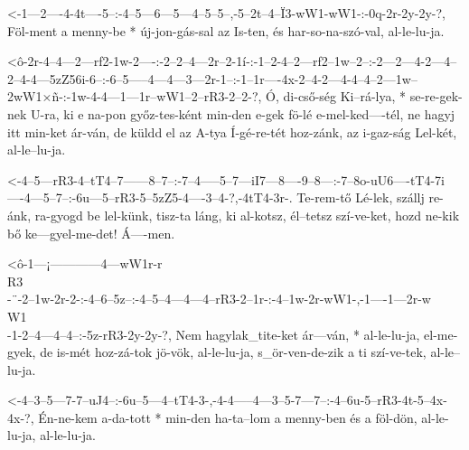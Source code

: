   {<-1---2----4-4t----5--:-4--5---6---5---4--5--5--,-5--2t--4--Ï3-wW1-wW1-:-0q-2r-2y-2y-?,}
  {  Föl-ment a menny-be * új-jon-gás-sal az Is-ten, és har-so-na-szó-val,  al-le-lu-ja.}

  {<ô-2r-4--4---2---rf2-1w-2----:-2--2--4---2r--2-1í-:-1--2-4--2---rf2--1w--2--:-2---2---4-2---4--2--4-4---5zZ56i-6--:-6--5-----4---4---3---2r-1--:-1--1r----4x-2--4-2---4-4--4--2---1w--2wW1×ñ-:-1w-4-4---1---1r--wW1--2--rR3-2--2-?,}
  {   Ó, di-cső-ség Ki--rá-lya, * se-re-gek-nek U-ra,  ki e na-pon győz-tes-ként min-den e-gek fö-lé e-mel-ked----tél, ne hagyj itt min-ket ár-ván, de küldd el az A-tya Í-gé-re-tét hoz-zánk,    az i-gaz-ság Lel-két, al-le--lu-ja.}




  {<-4--5---rR3-4--tT4--7------8--7--:-7--4-----5--7---iI7---8----9--8---:-7--8o-uU6----tT4-7i----4---5--7--:-6u---5--rR3-5--5zZ5-4----3--4-?,-4tT4-3r-.}
  {  Te-rem-tő  Lé-lek, szállj re-ánk, ra-gyogd be lel-künk, tisz-ta láng, ki al-kotsz, él--tetsz szí-ve-ket, hozd ne-kik bő ke---gyel-me-det! Á----men.}




  {<ô-1---¡------------4---wW1r-r\\R3\\-¨-2--1w-2r-2-:-4--6--5z--:-4--5--4---4---4--rR3-2--1r-:-4--1w-2r-wW1-,-1----1---2r-w\\W1\\-1-2--4---4--4--:-5z-rR3-2y-2y-?,}
  {   Nem hagylak_tite-ket ár---ván,    * al-le-lu-ja, el-me-gyek, de is-mét hoz-zá-tok jö-vök, al-le-lu-ja,   s_ör-ven-de-zik     a ti szí-ve-tek, al-le--lu-ja.}


  {<-4--3--5---7-7--uJ4--:-6u--5---4--tT4-3-,-4-4-----4---3--5-7---7--:-4--6u-5--rR3-4t-5--4x-4x-?,}
  {  Én-ne-kem a-da-tott * min-den ha-ta--lom a menny-ben és a föl-dön, al-le-lu-ja, al-le-lu-ja.}

